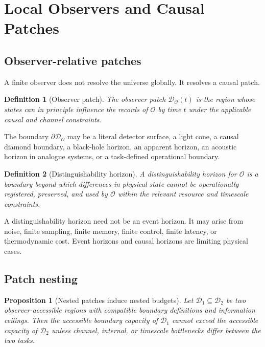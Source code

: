 \documentclass[10pt,a4paper,twocolumn,aps,prl]{revtex4-2}
\newtheorem{definition}{Definition}
\newtheorem{proposition}{Proposition}
\newcommand{\Obs}{\mathcal{O}}
\newcommand{\Patch}{\mathcal{D}}
\newcommand{\bd}{\partial}
\begin{document}
\section{Local Observers and Causal Patches}

\subsection{Observer-relative patches}

A finite observer does not resolve the universe globally. It resolves a causal patch.

\begin{definition}[Observer patch]
The observer patch $\Patch_{\Obs}(t)$ is the region whose states can in principle influence the records of $\Obs$ by time $t$ under the applicable causal and channel constraints.
\end{definition}

The boundary $\bd\Patch_{\Obs}$ may be a literal detector surface, a light cone, a causal diamond boundary, a black-hole horizon, an apparent horizon, an acoustic horizon in analogue systems, or a task-defined operational boundary.

\begin{definition}[Distinguishability horizon]
A distinguishability horizon for $\Obs$ is a boundary beyond which differences in physical state cannot be operationally registered, preserved, and used by $\Obs$ within the relevant resource and timescale constraints.
\end{definition}

A distinguishability horizon need not be an event horizon. It may arise from noise, finite sampling, finite memory, finite control, finite latency, or thermodynamic cost. Event horizons and causal horizons are limiting physical cases.

\subsection{Patch nesting}

\begin{proposition}[Nested patches induce nested budgets]
Let $\Patch_1\subseteq\Patch_2$ be two observer-accessible regions with compatible boundary definitions and information ceilings. Then the accessible boundary capacity of $\Patch_1$ cannot exceed the accessible capacity of $\Patch_2$ unless channel, internal, or timescale bottlenecks differ between the two tasks.
\end{proposition}
\end{document}

